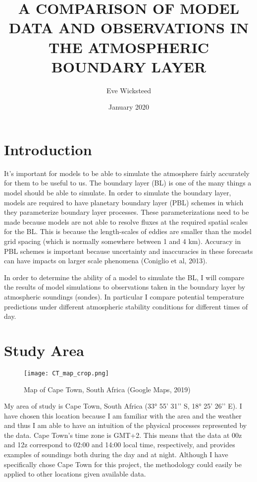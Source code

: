 \documentclass[12pt]{article}
\title{A COMPARISON OF MODEL DATA AND OBSERVATIONS IN THE ATMOSPHERIC BOUNDARY LAYER}
\author{Eve Wicksteed}
\date{January 2020}
\begin{document}
\maketitle

\section{Introduction}


It’s important for models to be able to simulate the atmosphere fairly accurately for them to 
be useful to us. The boundary layer (BL) is one of the many things a model should be able to 
simulate. In order to simulate the boundary layer, models are required to have planetary boundary 
layer (PBL) schemes in which they parameterize boundary layer processes.  These parameterizations 
need to be made because models are not able to resolve fluxes at the required spatial scales 
for the BL.  This is because the length-scales of eddies are smaller than the model grid spacing 
(which is normally somewhere between 1 and 4 km). Accuracy in PBL schemes is important because 
uncertainty and inaccuracies in these forecasts can have impacts on larger scale phenomena 
(Coniglio et al, 2013).

In order to determine the ability of a model to simulate the BL, I will compare the results of 
model simulations to observations taken in the boundary layer by atmospheric soundings (sondes). 
In particular I compare potential temperature predictions under different atmospheric stability 
conditions for different times of day. 


\section{Study Area}


\begin{figure}[h]
    \centering
    \texttt{[image: CT\_map\_crop.png]}
    \caption{Map of Cape Town, South Africa (Google Maps, 2019)}
    \label{fig:map}
\end{figure}

My area of study is Cape Town, South Africa (33° 55’ 31’’ S, 18° 25’ 26’’ E). I have chosen 
this location because I am familiar with the area and the weather and thus I am able to have 
an intuition of the physical processes represented by the data. Cape Town’s time zone is GMT+2. 
This means that the data at 00z and 12z correspond to 02:00 and 14:00 local time, respectively, 
and provides examples of soundings both during the day and at night. Although I have specifically 
chose Cape Town for this project, the methodology could easily be applied to other locations 
given available data.
\end{document}
